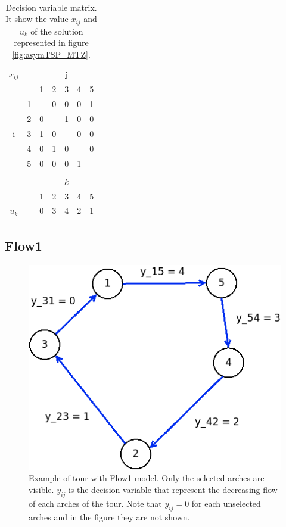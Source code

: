 \begin{table}[h!]
	\begin{center}$  $
		\caption{Decision variable matrix. It show the value $ x_{ij} $ and $ u_k $ of the solution represented in figure \ref{fig:asymTSP_MTZ}. }
		\label{tab:asymTSP_MTZ_solution}
		\begin{tabular}{cc|c|c|c|c|c|}
			 $ x_{ij} $ & \multicolumn{1}{c}{} & \multicolumn{5}{c}{j} \\ %
			& \multicolumn{1}{c}{} & \multicolumn{1}{c}{1} & \multicolumn{1}{c}{2} & \multicolumn{1}{c}{3} & \multicolumn{1}{c}{4} & \multicolumn{1}{c}{5} \\ \cline{3-7}
			\multirow{5}{*}{i} 	& 1 & \cellcolor{Black} & 0 & 0 & 0 & 1 \\ \cline{3-7}
			& 2 & 0 & \cellcolor{Black} & 1 & 0 & 0 \\ \cline{3-7}
			& 3 & 1 & 0 & \cellcolor{Black} & 0 & 0 \\ \cline{3-7}
			& 4 & 0 & 1 & 0 & \cellcolor{Black} & 0 \\ \cline{3-7}
			& 5 & 0 & 0 & 0 & 1 & \cellcolor{Black} \\ \cline{3-7}
			\multicolumn{7}{c}{} \\ 
			
			\multicolumn{2}{c}{} & \multicolumn{5}{c}{$ k $} \\  
			& \multicolumn{1}{c}{} & \multicolumn{1}{c}{1} & \multicolumn{1}{c}{2} & \multicolumn{1}{c}{3} & \multicolumn{1}{c}{4} & \multicolumn{1}{c}{5} \\ \cline{3-7}
 			$ u_k $ &  & 0 & 3 & 4 & 2 & 1 \\ \cline{3-7}
		\end{tabular}
	\end{center}
\end{table}

\subsection{Flow1}

\begin{figure}[h]
	\centering
	\includegraphics[width=.4\columnwidth]{img/asymTSP_F1_example.png}
	\caption{Example of tour with Flow1 model. Only the selected arches are visible. $ y_{ij} $ is the decision variable that represent the decreasing flow of each arches of the tour. Note that $ y_{ij} = 0 $ for each unselected arches and in the figure they are not shown.}
	\label{fig:asymTSP_F1}
\end{figure}

